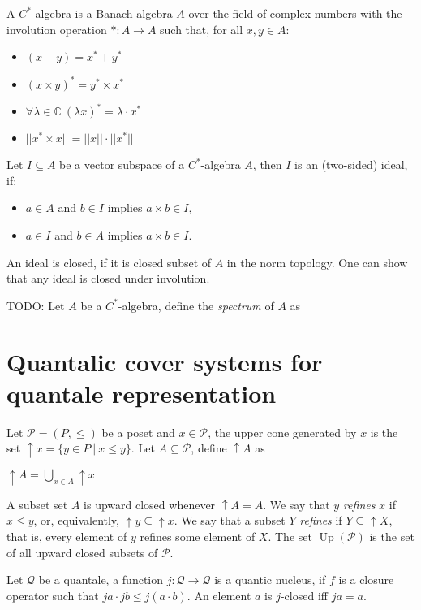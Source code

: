 \documentclass[a4paper]{article}
\theoremstyle{defin}
\theoremstyle{theorem}
\theoremstyle{claim}
\theoremstyle{prop}
\theoremstyle{lemma}
\theoremstyle{fact}
\theoremstyle{ex}
\theoremstyle{col}
\begin{document}
A $C^{*}$-algebra is a Banach algebra $A$ over the field of complex numbers with the involution operation $* : A \to A$ such that, for all $x, y \in A$:
\begin{itemize}
\item $(x + y) = x^* + y^*$
\item $(x \times y)^* = y^* \times x^*$
\item $\forall \lambda \in \mathbb{C} \: (\lambda x)^* = \lambda \cdot x^*$
\item $||x^* \times x|| = ||x||\cdot||x^*||$
\end{itemize}

Let $I \subseteq A$ be a vector subspace of a $C^*$-algebra $A$, then $I$ is an (two-sided) ideal, if:
\begin{itemize}
\item $a \in A$ and $b \in I$ implies $a \times b \in I$,
\item $a \in I$ and $b \in A$ implies $a \times b \in I$.
\end{itemize}
An ideal is closed, if it is closed subset of $A$ in the norm topology. One can show that any ideal is closed under involution.

TODO: Let $A$ be a $C^*$-algebra, define the \emph{spectrum} of $A$ as

\section{Quantalic cover systems for quantale representation}

Let $\mathcal{P} = (P, \leq)$ be a poset and $x \in \mathcal{P}$, the upper cone generated by $x$ is the set $\uparrow x = \{ y \in P \: | \: x \leq y \}$. Let $A \subseteq \mathcal{P}$, define $\uparrow A$ as
\begin{center}
$\uparrow A = \bigcup \limits_{x \in A} \uparrow x$
\end{center}
A subset set $A$ is upward closed whenever $\uparrow A = A$.
We say that $y$ \emph{refines} $x$ if $x \leq y$, or, equivalently, $\uparrow y \subseteq \uparrow x$. We say that a subset $Y$ \emph{refines} if $Y \subseteq \uparrow X$, that is, every element of $y$ refines some element of $X$. The set $\operatorname{Up}(\mathcal{P})$ is the set of all upward closed subsets of $\mathcal{P}$.

Let $\mathcal{Q}$ be a quantale, a function $j : \mathcal{Q} \to \mathcal{Q}$ is a quantic nucleus, if $f$ is a closure operator such that $j a \cdot j b \leq j (a \cdot b)$. An element $a$ is $j$-closed iff $j a = a$.
\end{document}
